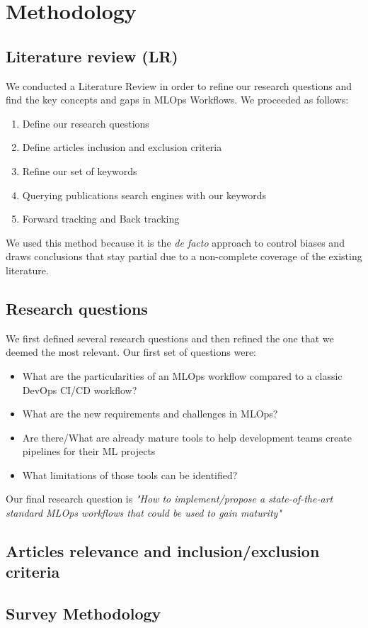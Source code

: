 \section{Methodology}\label{sec:methodo}
\subsection{Literature review (LR)}

We conducted a Literature Review in order to refine our research questions and find the key concepts and gaps in MLOps Workflows.
We proceeded as follows:

\begin{enumerate}
    \item Define our research questions
    \item Define articles inclusion and exclusion criteria
    \item Refine our set of keywords
    \item Querying publications search engines with our keywords
    \item Forward tracking and Back tracking
\end{enumerate}

We used this method because it is the \textit{de facto} approach to control biases and draws conclusions that stay partial due to
a non-complete coverage of the existing literature.

\subsection{Research questions}

We first defined several research questions and then refined the one that we deemed the most relevant.
Our first set of questions were:
\begin{itemize}
    \item What are the particularities of an MLOps workflow compared to a classic DevOps CI/CD workflow?
    \item What are the new requirements and challenges in MLOps?
    \item Are there/What are already mature tools to help development teams create pipelines for their ML projects
    \item What limitations of those tools can be identified?
\end{itemize}

Our final research question is
\textit{"How to implement/propose a state-of-the-art standard MLOps workflows that could be used to gain maturity"}\cite{mlops-definition-tools-and-challenge}\cite{mlops-maturity-model}

\subsection{Articles relevance and inclusion/exclusion criteria}

\subsection{Survey Methodology}
